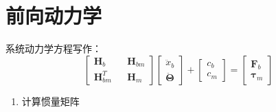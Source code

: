 \documentclass[UTF8]{ctexart}
\begin{document}
\section{前向动力学}
系统动力学方程写作：
\begin{equation*}
	\left[\begin{matrix}
	\boldsymbol{H}_{b} && \boldsymbol{H}_{bm}\\
	\boldsymbol{H}_{bm}^{T} && \boldsymbol{H}_{m}
	\end{matrix}\right]\left[\begin{matrix}
	\ddot{x}_{b}\\
	\ddot{\boldsymbol{\Theta}}
	\end{matrix}\right]+\left[\begin{matrix}
	c_{b}\\
	c_{m}
	\end{matrix}\right]=\left[\begin{matrix}
	\boldsymbol{F}_{b}\\
	\boldsymbol{\tau}_{m}
	\end{matrix}\right]
\end{equation*}
\begin{enumerate}[itemindent=0.3em]
	\item 计算惯量矩阵
\end{enumerate}
\end{document}
